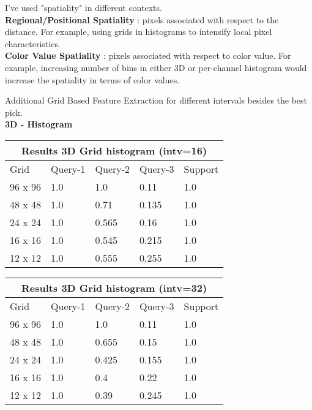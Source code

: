 \documentclass[12pt]{article}
\begin{document}
I've used "spatiality" in different contexts. \\

\textbf{Regional/Positional Spatiality} \label{RS}: pixels associated with respect to the distance.
For example, using grids in histograms to intensify local pixel characteristics. \\

\textbf{Color Value Spatiality} \label{CVS}: pixels associated with respect to color value.
For example, increasing number of bins in either 3D or per-channel histogram would
increase the spatiality in terms of color values.


\newpage

Additional Grid Based Feature Extraction for different intervals besides the best pick. \\




\textbf{3D - Histogram} \\ 

\begin{tabular}{ |p{1.5cm}||p{2cm}|p{2cm}|p{2cm}|p{2cm}|  }
    \hline
    \multicolumn{5}{|c|}{Results 3D Grid histogram (intv=16)} \\
    \hline
    Grid & Query-1 & Query-2 & Query-3 & Support \\
    \hline
    96 x 96 & 1.0 & 1.0 & 0.11 & 1.0 \\
    \hline
    48 x 48 & 1.0 & 0.71 & 0.135 & 1.0 \\
    \hline
    24 x 24 & 1.0 & 0.565 & 0.16 & 1.0 \\
    \hline
    16 x 16 & 1.0 & 0.545 & 0.215 & 1.0 \\
    \hline
    12 x 12 & 1.0 & 0.555 & 0.255 & 1.0 \\
    \hline
\end{tabular}

\begin{tabular}{ |p{1.5cm}||p{2cm}|p{2cm}|p{2cm}|p{2cm}|  }
    \hline
    \multicolumn{5}{|c|}{Results 3D Grid histogram (intv=32)} \\
    \hline
    Grid & Query-1 & Query-2 & Query-3 & Support \\
    \hline
    96 x 96 & 1.0 & 1.0 & 0.11 & 1.0 \\
    \hline
    48 x 48 & 1.0 & 0.655 & 0.15 & 1.0 \\
    \hline
    24 x 24 & 1.0 & 0.425 & 0.155 & 1.0 \\
    \hline
    16 x 16 & 1.0 & 0.4 & 0.22 & 1.0 \\
    \hline
    12 x 12 & 1.0 & 0.39 & 0.245 & 1.0 \\
    \hline
\end{tabular}
\end{document}
